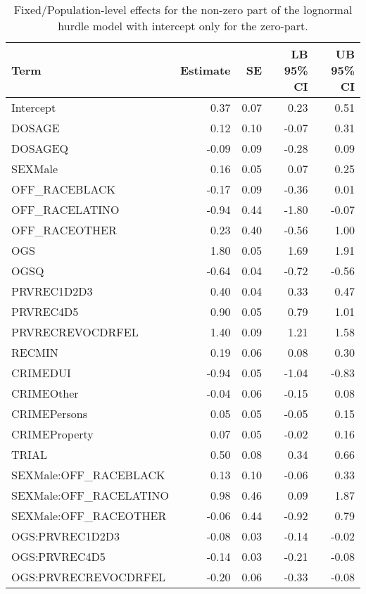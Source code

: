 \documentclass[
  letterpaper,
  DIV=11,
  numbers=noendperiod]{scrartcl}
\begin{document}
\hypertarget{tbl-brms-hurdle-fe-int-only}{}
\begin{table}
\caption{\label{tbl-brms-hurdle-fe-int-only}Fixed/Population-level effects for the non-zero part of the lognormal
hurdle model with intercept only for the zero-part. }\tabularnewline

\centering
\begin{tabular}{l|r|r|r|r}
\hline
Term & Estimate & SE & LB 95\% CI & UB 95\% CI\\
\hline
Intercept & 0.37 & 0.07 & 0.23 & 0.51\\
\hline
DOSAGE & 0.12 & 0.10 & -0.07 & 0.31\\
\hline
DOSAGEQ & -0.09 & 0.09 & -0.28 & 0.09\\
\hline
SEXMale & 0.16 & 0.05 & 0.07 & 0.25\\
\hline
OFF\_RACEBLACK & -0.17 & 0.09 & -0.36 & 0.01\\
\hline
OFF\_RACELATINO & -0.94 & 0.44 & -1.80 & -0.07\\
\hline
OFF\_RACEOTHER & 0.23 & 0.40 & -0.56 & 1.00\\
\hline
OGS & 1.80 & 0.05 & 1.69 & 1.91\\
\hline
OGSQ & -0.64 & 0.04 & -0.72 & -0.56\\
\hline
PRVREC1D2D3 & 0.40 & 0.04 & 0.33 & 0.47\\
\hline
PRVREC4D5 & 0.90 & 0.05 & 0.79 & 1.01\\
\hline
PRVRECREVOCDRFEL & 1.40 & 0.09 & 1.21 & 1.58\\
\hline
RECMIN & 0.19 & 0.06 & 0.08 & 0.30\\
\hline
CRIMEDUI & -0.94 & 0.05 & -1.04 & -0.83\\
\hline
CRIMEOther & -0.04 & 0.06 & -0.15 & 0.08\\
\hline
CRIMEPersons & 0.05 & 0.05 & -0.05 & 0.15\\
\hline
CRIMEProperty & 0.07 & 0.05 & -0.02 & 0.16\\
\hline
TRIAL & 0.50 & 0.08 & 0.34 & 0.66\\
\hline
SEXMale:OFF\_RACEBLACK & 0.13 & 0.10 & -0.06 & 0.33\\
\hline
SEXMale:OFF\_RACELATINO & 0.98 & 0.46 & 0.09 & 1.87\\
\hline
SEXMale:OFF\_RACEOTHER & -0.06 & 0.44 & -0.92 & 0.79\\
\hline
OGS:PRVREC1D2D3 & -0.08 & 0.03 & -0.14 & -0.02\\
\hline
OGS:PRVREC4D5 & -0.14 & 0.03 & -0.21 & -0.08\\
\hline
OGS:PRVRECREVOCDRFEL & -0.20 & 0.06 & -0.33 & -0.08\\
\hline
\end{tabular}
\end{table}
\end{document}
